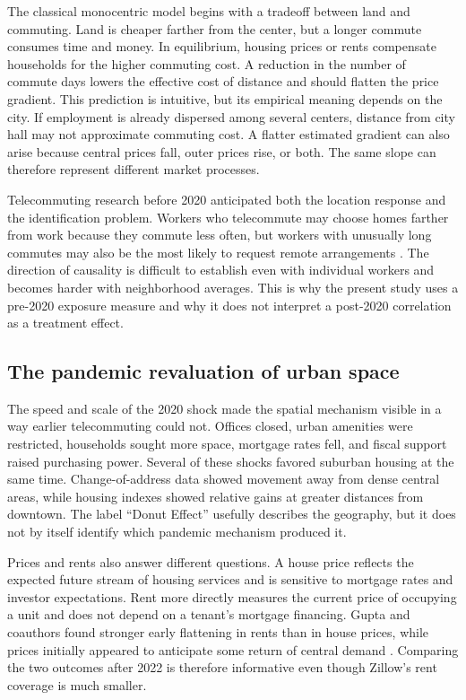 \documentclass[11pt]{article}
\begin{document}
The classical monocentric model begins with a tradeoff between land and commuting. Land is cheaper farther from the center, but a
longer commute consumes time and money. In equilibrium, housing prices or rents compensate households for the higher commuting
cost. A reduction in the number of commute days lowers the effective cost of distance and should flatten the price gradient. This
prediction is intuitive, but its empirical meaning depends on the city. If employment is already dispersed among several centers,
distance from city hall may not approximate commuting cost. A flatter estimated gradient can also arise because central prices
fall, outer prices rise, or both. The same slope can therefore represent different market processes.

Telecommuting research before 2020 anticipated both the location response and the identification problem. Workers who telecommute
may choose homes farther from work because they commute less often, but workers with unusually long commutes may also be the most
likely to request remote arrangements \cite{mokhtarian2004telecommuting}. The direction of causality is difficult to establish even
with individual workers and becomes harder with neighborhood averages. This is why the present study uses a pre-2020 exposure
measure and why it does not interpret a post-2020 correlation as a treatment effect.

\subsection{The pandemic revaluation of urban space}

The speed and scale of the 2020 shock made the spatial mechanism visible in a way earlier telecommuting could not. Offices closed,
urban amenities were restricted, households sought more space, mortgage rates fell, and fiscal support raised purchasing power.
Several of these shocks favored suburban housing at the same time. Change-of-address data showed movement away from dense central
areas, while housing indexes showed relative gains at greater distances from downtown. The label ``Donut Effect'' usefully
describes the geography, but it does not by itself identify which pandemic mechanism produced it.

Prices and rents also answer different questions. A house price reflects the expected future stream of housing services and is
sensitive to mortgage rates and investor expectations. Rent more directly measures the current price of occupying a unit and does
not depend on a tenant's mortgage financing. Gupta and coauthors found stronger early flattening in rents than in house prices,
while prices initially appeared to anticipate some return of central demand \cite{gupta2022flattening}. Comparing the two outcomes
after 2022 is therefore informative even though Zillow's rent coverage is much smaller.
\end{document}
